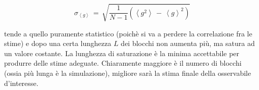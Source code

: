 \begin{equation}
    \sigma_{\left<g\right>}\,=\,\sqrt{\frac{1}{N-1}\left(\left<g^2\right>\,-\,\left<g\right>^2\right)}
    \label{eq: error_data_block}
\end{equation}

tende a quello puramente statistico (poichè si va a perdere la correlazione fra le stime) e dopo una certa lunghezza $L$ dei blocchi 
non aumenta più, ma satura ad un valore costante. La lunghezza di saturazione è la minima accettabile per produrre delle stime adeguate. 
Chiaramente maggiore è il numero di blocchi (ossia più lunga è la simulazione), migliore sarà la stima finale della osservabile 
d'interesse.